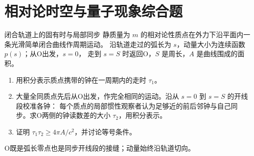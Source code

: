 \section{相对论时空与量子现象综合题}
\begingroup{}

\begingroup{}
\begin{advexamplebox}{闭合轨道上的固有时与局部同步}\label{advA6:ex:closed-clock}
静质量为 $m$ 的相对论性质点在外力下沿平面内一条光滑简单闭合曲线作周期运动。
沿轨道走过的弧长为 $s$，动量大小为连续函数 $p(s)$；从O出发，$s=0$，
走到 $s=S$ 时返回O，$S$ 是周长，$A$ 是曲线围成的面积。
\begin{enumerate}
\item 用积分表示质点携带的钟在一周期内的走时 $\tau_1$。
\item 大量全同质点先后从O出发，作完全相同的运动。沿从 $s=0$ 到 $s=S$ 的开线段校准各钟：
每个质点的局部惯性观察者认为足够近的前后邻钟与自己同步。求O两侧的钟读数差的大小 $\tau_2$，用积分表示。
\item 证明 $\tau_1\tau_2\ge4\pi A/c^2$，并讨论等号条件。
\end{enumerate}
\begin{center}

\label{advA6:quality:A6-source-exercises:q1}

\par\smallskip
O既是弧长零点也是同步开线段的接缝；动量始终沿轨道切向。
\end{center}
\end{advexamplebox}
\endgroup\par\nopagebreak[3]
\global\AdvHideHeadingtrue
